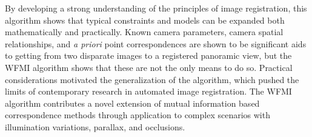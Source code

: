 By developing a strong understanding of the principles of image registration, this algorithm shows that typical constraints and models can be expanded both mathematically and practically. Known camera parameters, camera spatial relationships, and \textit{a priori} point correspondences are shown to be significant aids to getting from two disparate images to a registered panoramic view, but the WFMI algorithm shows that these are not the only means to do so. Practical considerations motivated the generalization of the algorithm, which pushed the limits of contemporary research in automated image registration. The WFMI algorithm contributes a novel extension of mutual information based correspondence methods through application to complex scenarios with illumination variations, parallax, and occlusions.




